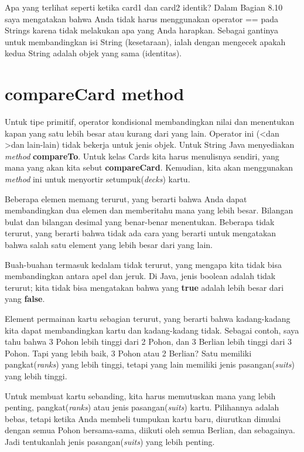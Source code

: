 \documentclass[12pt,b5paper,openright,twoside]{book}
\begin{document}
\noindent
\newline 
\newline 
\newline Apa yang terlihat seperti ketika card1 dan card2 identik?
Dalam Bagian 8.10 saya mengatakan bahwa Anda tidak harus menggunakan operator == pada Strings karena tidak melakukan apa yang Anda harapkan. Sebagai gantinya untuk membandingkan isi String (kesetaraan), ialah dengan mengecek apakah kedua String adalah objek yang sama (identitas).

\section{compareCard method}
Untuk tipe primitif, operator kondisional membandingkan nilai dan menentukan kapan yang satu lebih besar atau kurang dari yang lain. Operator ini (\textless  dan \textgreater dan lain-lain) tidak bekerja untuk jenis objek. Untuk String Java menyediakan \textit{method} \textbf{compareTo}. Untuk kelas Cards kita harus menulisnya sendiri, yang mana yang akan kita sebut \textbf{compareCard}. Kemudian, kita akan menggunakan \textit{method} ini untuk menyortir setumpuk(\textit{decks}) kartu.

\noindent Beberapa elemen memang terurut, yang berarti bahwa Anda dapat membandingkan dua elemen dan memberitahu mana yang lebih besar. Bilangan bulat dan bilangan desimal yang benar-benar menentukan. Beberapa tidak terurut, yang berarti bahwa tidak ada cara yang berarti untuk mengatakan bahwa salah satu element yang lebih besar dari yang lain. 

\noindent Buah-buahan termasuk kedalam tidak terurut, yang mengapa kita tidak bisa membandingkan antara apel dan jeruk. Di Java, jenis boolean adalah tidak terurut; kita tidak bisa mengatakan bahwa yang \textbf{true} adalah lebih besar dari yang \textbf{false}.

\noindent Element permainan kartu sebagian terurut, yang berarti bahwa kadang-kadang kita dapat membandingkan kartu dan kadang-kadang tidak. Sebagai contoh, saya tahu bahwa 3 Pohon lebih tinggi dari 2 Pohon, dan 3 Berlian lebih tinggi dari 3 Pohon. Tapi yang lebih baik, 3 Pohon atau 2 Berlian? Satu memiliki pangkat(\textit{ranks}) yang lebih tinggi, tetapi yang lain memiliki jenis pasangan(\textit{suits}) yang lebih tinggi.

\noindent Untuk membuat kartu sebanding, kita harus memutuskan mana yang lebih penting, pangkat(\textit{ranks}) atau jenis pasangan(\textit{suits}) kartu. Pilihannya adalah bebas, tetapi ketika Anda membeli tumpukan kartu baru,  diurutkan dimulai dengan semua Pohon bersama-sama, diikuti oleh semua Berlian, dan sebagainya. Jadi tentukanlah jenis pasangan(\textit{suits}) yang lebih penting.
\end{document}
